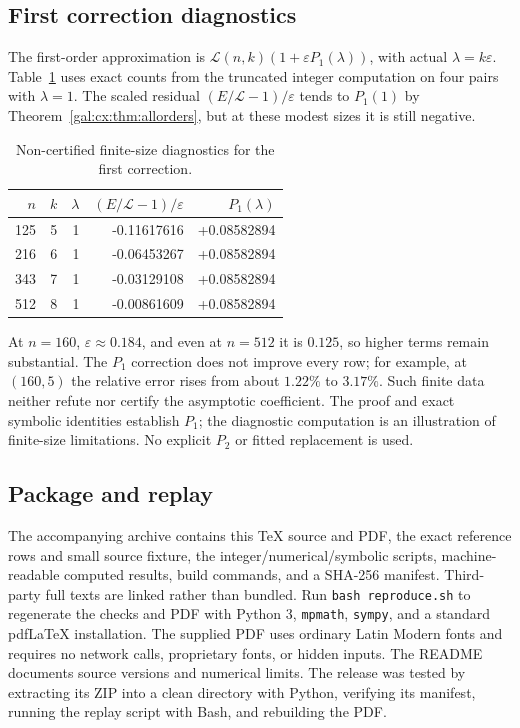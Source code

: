 \documentclass[11pt,letterpaper]{article}
\numberwithin{equation}{section}
\theoremstyle{definition}\newtheorem{definition}[theorem]{Definition}
\theoremstyle{remark}\newtheorem{remark}[theorem]{Remark}
\newcommand{\eps}{\varepsilon}
\begin{document}
\subsection{First correction diagnostics}
The first-order approximation is $\mathcal L(n,k)(1+\eps P_1(\lambda))$, with actual $\lambda=k\eps$. Table~\ref{gal:cx:tab:p1} uses exact counts from the truncated integer computation on four pairs with $\lambda=1$. The scaled residual $(E/\mathcal L-1)/\eps$ tends to $P_1(1)$ by Theorem~\ref{gal:cx:thm:allorders}, but at these modest sizes it is still negative.
\par
\begin{table}[htbp]
\centering\small
\begin{tabular}{rrrrr}
\toprule
$n$&$k$&$\lambda$&$(E/\mathcal L-1)/\eps$&$P_1(\lambda)$\\
\midrule
125 & 5 & 1 & -0.11617616 & +0.08582894 \\
216 & 6 & 1 & -0.06453267 & +0.08582894 \\
343 & 7 & 1 & -0.03129108 & +0.08582894 \\
512 & 8 & 1 & -0.00861609 & +0.08582894 \\
\bottomrule
\end{tabular}
\caption{Non-certified finite-size diagnostics for the first correction.}\label{gal:cx:tab:p1}
\end{table}
\par
At $n=160$, $\eps\approx0.184$, and even at $n=512$ it is $0.125$, so higher terms remain substantial. The $P_1$ correction does not improve every row; for example, at $(160,5)$ the relative error rises from about $1.22\%$ to $3.17\%$. Such finite data neither refute nor certify the asymptotic coefficient. The proof and exact symbolic identities establish $P_1$; the diagnostic computation is an illustration of finite-size limitations. No explicit $P_2$ or fitted replacement is used.

\subsection{Package and replay}
The accompanying archive contains this TeX source and PDF, the exact reference rows and small source fixture, the integer/numerical/symbolic scripts, machine-readable computed results, build commands, and a SHA-256 manifest. Third-party full texts are linked rather than bundled. Run \texttt{bash reproduce.sh} to regenerate the checks and PDF with Python 3, \texttt{mpmath}, \texttt{sympy}, and a standard pdfLaTeX installation. The supplied PDF uses ordinary Latin Modern fonts and requires no network calls, proprietary fonts, or hidden inputs. The README documents source versions and numerical limits. The release was tested by extracting its ZIP into a clean directory with Python, verifying its manifest, running the replay script with Bash, and rebuilding the PDF.
\end{document}
